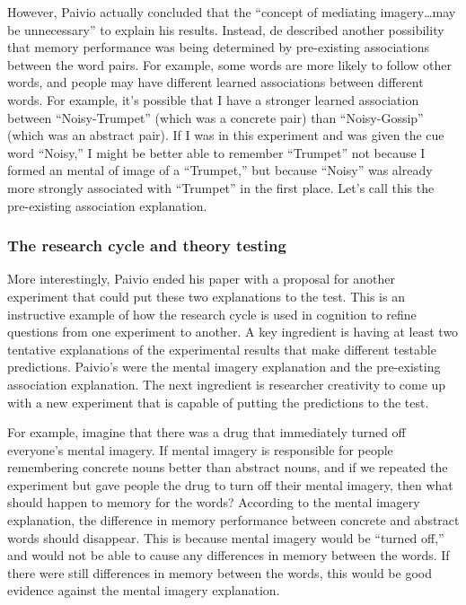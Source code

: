 \documentclass[
  oneside,
  12pt]{crumpbook}
\begin{document}
However, Paivio actually concluded that the ``concept of mediating imagery\ldots may be unnecessary'' to explain his results. Instead, de described another possibility that memory performance was being determined by pre-existing associations between the word pairs. For example, some words are more likely to follow other words, and people may have different learned associations between different words. For example, it's possible that I have a stronger learned association between ``Noisy-Trumpet'' (which was a concrete pair) than ``Noisy-Gossip'' (which was an abstract pair). If I was in this experiment and was given the cue word ``Noisy,'' I might be better able to remember ``Trumpet'' not because I formed an mental of image of a ``Trumpet,'' but because ``Noisy'' was already more strongly associated with ``Trumpet'' in the first place. Let's call this the pre-existing association explanation.

\hypertarget{the-research-cycle-and-theory-testing}{%
\subsubsection{The research cycle and theory testing}\label{the-research-cycle-and-theory-testing}}

More interestingly, Paivio ended his paper with a proposal for another experiment that could put these two explanations to the test. This is an instructive example of how the research cycle is used in cognition to refine questions from one experiment to another. A key ingredient is having at least two tentative explanations of the experimental results that make different testable predictions. Paivio's were the mental imagery explanation and the pre-existing association explanation. The next ingredient is researcher creativity to come up with a new experiment that is capable of putting the predictions to the test.

For example, imagine that there was a drug that immediately turned off everyone's mental imagery. If mental imagery is responsible for people remembering concrete nouns better than abstract nouns, and if we repeated the experiment but gave people the drug to turn off their mental imagery, then what should happen to memory for the words? According to the mental imagery explanation, the difference in memory performance between concrete and abstract words should disappear. This is because mental imagery would be ``turned off,'' and would not be able to cause any differences in memory between the words. If there were still differences in memory between the words, this would be good evidence against the mental imagery explanation.
\end{document}
